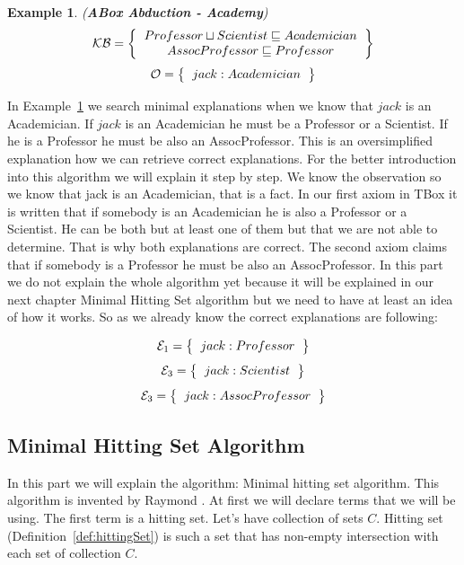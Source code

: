 \documentclass[12pt,a4paper]{article}
\newtheorem{example}{Example}[subsection]
\begin{document}
\begin{example}{(\textbf{ABox Abduction - Academy})}
	\label{example:abductionAcademy}
	\[ 
	\mathcal{KB} = \left\{
	\begin{tabular}{c c}
		$Professor \sqcup Scientist \sqsubseteq Academician$ \\
		$AssocProfessor \sqsubseteq Professor$ \\
	\end{tabular}
	\right \}
	\]
	\[ 
	\mathcal{O} = \left\{
	\begin{tabular}{c c}
		$jack : Academician$
	\end{tabular}
	\right \}
	\]								
\end{example}

In Example~\ref{example:abductionAcademy} we search minimal explanations when we know that $jack$ is an Academician. If $jack$ is an Academician he must be a Professor or a Scientist. If he is a Professor he must be also an AssocProfessor. This is an oversimplified explanation how we can retrieve correct explanations. For the better introduction into this algorithm we will explain it step by step. We know the observation so we know that jack is an Academician, that is a fact. In our first axiom in TBox it is written that if somebody is an Academician he is also a Professor or a Scientist. He can be both but at least one of them but that we are not able to determine. That is why both explanations are correct. The second axiom claims that if somebody is a Professor he must be also an AssocProfessor. In this part we do not explain the whole algorithm yet because it will be explained in our next chapter Minimal Hitting Set algorithm but we need to have at least an idea of how it works. So as we already know the correct explanations are following:

\[ 
\mathcal{E}_{1} = \left\{
\begin{tabular}{c c}
	$jack : Professor$ \\
\end{tabular}
\right \}
\]
\[ 
\mathcal{E}_{3} = \left\{
\begin{tabular}{c c}
	$jack : Scientist$ \\
\end{tabular}
\right \}
\]
\[ 
\mathcal{E}_{3} = \left\{
\begin{tabular}{c c}
	$jack : AssocProfessor$ \\
\end{tabular}
\right \}
\]

\subsection{Minimal Hitting Set Algorithm}
In this part we will explain the algorithm: Minimal hitting set algorithm. This algorithm is invented by Raymond \cite{reiterHS}. At first we will declare terms that we will be using. The first term is a hitting set. Let's have collection of sets $C$. Hitting set (Definition~\ref{def:hittingSet}) is such a set that has non-empty intersection with each set of collection $C$.
\end{document}
